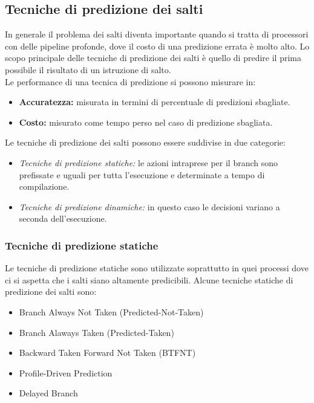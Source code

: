 \subsection{Tecniche di predizione dei salti}
In generale il problema dei salti diventa importante quando si tratta di processori con delle pipeline profonde, dove il costo di una predizione errata è molto alto. Lo scopo principale delle tecniche di predizione dei salti è quello di predire il prima possibile il risultato di un istruzione di salto.\\
Le performance di una tecnica di predizione si possono misurare in:
\begin{itemize}
\item \textbf{Accuratezza:} misurata in termini di percentuale di predizioni sbagliate.
\item \textbf{Costo:} misurato come tempo perso nel caso di predizione sbagliata.
\end{itemize}
Le tecniche di predizione dei salti possono essere suddivise in due categorie:
\begin{itemize}
\item \emph{Tecniche di predizione statiche:} le azioni intraprese per il branch sono prefissate e uguali per tutta l'esecuzione e determinate a tempo di compilazione.
\item \emph{Tecniche di predizione dinamiche:} in questo caso le decisioni variano a seconda dell'esecuzione.
\end{itemize}
\subsubsection{Tecniche di predizione statiche}
Le tecniche di predizione statiche sono utilizzate soprattutto in quei processi dove ci si aspetta che i salti siano altamente predicibili. Alcune tecniche statiche di predizione dei salti sono:
\begin{itemize}
\item Branch Always Not Taken (Predicted-Not-Taken)
\item Branch Alaways Taken (Predicted-Taken)
\item Backward Taken Forward Not Taken (BTFNT)
\item Profile-Driven Prediction
\item Delayed Branch
\end{itemize}
